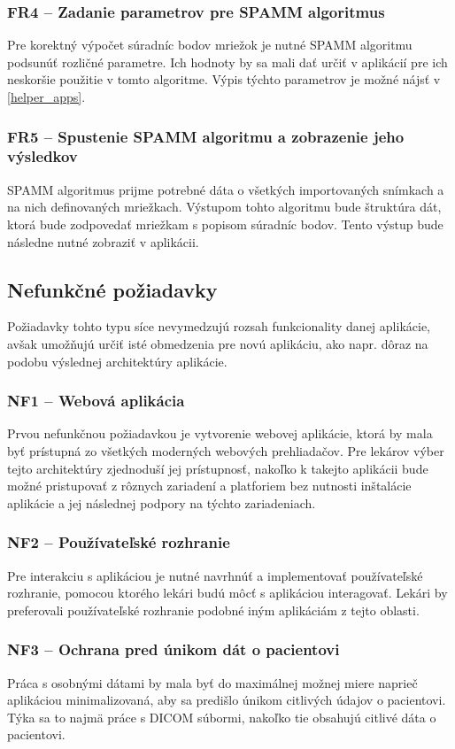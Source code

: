 \subsubsection {FR4 -- Zadanie parametrov pre SPAMM algoritmus}\label{fr4}
Pre korektný výpočet súradníc bodov mriežok je nutné SPAMM algoritmu podsunúť rozličné parametre. Ich hodnoty by sa mali dať určiť v aplikácií pre ich neskoršie použitie v tomto algoritme. Výpis týchto parametrov je možné nájsť v \ref{helper_apps}.

\subsubsection {FR5 -- Spustenie SPAMM algoritmu a zobrazenie jeho výsledkov}\label{fr5}
SPAMM algoritmus prijme potrebné dáta o všetkých importovaných snímkach a na nich definovaných mriežkach. Výstupom tohto algoritmu bude štruktúra dát, ktorá bude zodpovedať mriežkam s popisom súradníc bodov. Tento výstup bude následne nutné zobraziť v aplikácii.

\subsection {Nefunkčné požiadavky}
Požiadavky tohto typu síce nevymedzujú rozsah funkcionality danej aplikácie, avšak umožňujú určiť isté obmedzenia pre novú aplikáciu, ako napr. dôraz na podobu výslednej architektúry aplikácie.

\subsubsection {NF1 -- Webová aplikácia}
Prvou nefunkčnou požiadavkou je vytvorenie webovej aplikácie, ktorá by mala byť prístupná zo všetkých moderných webových prehliadačov. Pre lekárov výber tejto architektúry zjednoduší jej prístupnosť, nakoľko k takejto aplikácii bude možné pristupovať z rôznych zariadení a platforiem bez nutnosti inštalácie aplikácie a jej následnej podpory na týchto zariadeniach.

\subsubsection {NF2 -- Používateľské rozhranie}
Pre interakciu s aplikáciou je nutné navrhnúť a implementovať používateľské rozhranie, pomocou ktorého lekári budú môcť s aplikáciou interagovať. Lekári by preferovali používateľské rozhranie podobné iným aplikáciám z tejto oblasti.

\subsubsection {NF3 -- Ochrana pred únikom dát o pacientovi}
Práca s osobnými dátami by mala byť do maximálnej možnej miere naprieč aplikáciou minimalizovaná, aby sa predišlo únikom citlivých údajov o pacientovi. Týka sa to najmä práce s DICOM súbormi, nakoľko tie obsahujú citlivé dáta o pacientovi.

